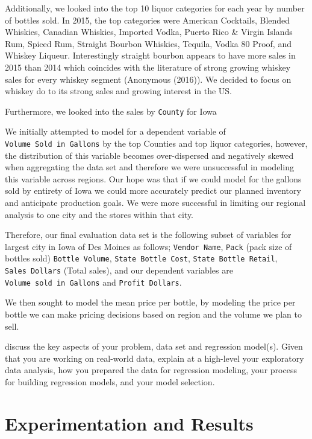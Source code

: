 \documentclass[]{elsarticle} %
\begin{document}
Additionally, we looked into the top 10 liquor categories for each year
by number of bottles sold. In 2015, the top categories were American
Cocktails, Blended Whiskies, Canadian Whiskies, Imported Vodka, Puerto
Rico \& Virgin Islands Rum, Spiced Rum, Straight Bourbon Whiskies,
Tequila, Vodka 80 Proof, and Whiskey Liqueur. Interestingly straight
bourbon appears to have more sales in 2015 than 2014 which coincides
with the literature of strong growing whiskey sales for every whiskey
segment (Anonymous (2016)). We decided to focus on whiskey do to its
strong sales and growing interest in the US.

Furthermore, we looked into the sales by \texttt{County} for Iowa

We initially attempted to model for a dependent variable of
\texttt{Volume\ Sold\ in\ Gallons} by the top Counties and top liquor
categories, however, the distribution of this variable becomes
over-dispersed and negatively skewed when aggregating the data set and
therefore we were unsuccessful in modeling this variable across regions.
Our hope was that if we could model for the gallons sold by entirety of
Iowa we could more accurately predict our planned inventory and
anticipate production goals. We were more successful in limiting our
regional analysis to one city and the stores within that city.

Therefore, our final evaluation data set is the following subset of
variables for largest city in Iowa of Des Moines as follows;
\texttt{Vendor\ Name}, \texttt{Pack} (pack size of bottles sold)
\texttt{Bottle\ Volume}, \texttt{State\ Bottle\ Cost},
\texttt{State\ Bottle\ Retail}, \texttt{Sales\ Dollars} (Total sales),
and our dependent variables are \texttt{Volume\ sold\ in\ Gallons} and
\texttt{Profit\ Dollars}.

We then sought to model the mean price per bottle, by modeling the price
per bottle we can make pricing decisions based on region and the volume
we plan to sell.

discuss the key aspects of your problem, data set and regression
model(s). Given that you are working on real-world data, explain at a
high-level your exploratory data analysis, how you prepared the data for
regression modeling, your process for building regression models, and
your model selection.

\section{Experimentation and Results}\label{experimentation-and-results}
\end{document}
